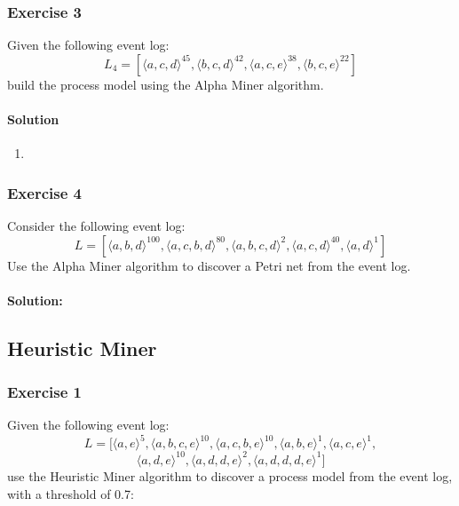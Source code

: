 \subsubsection{Exercise 3}
Given the following event log:
\[L_4 = [\langle a,c,d \rangle^{45}, \langle b,c,d \rangle^{42}, \langle a,c,e \rangle^{38}, \langle b,c,e \rangle^{22}]\]
build the process model using the Alpha Miner algorithm.
\paragraph{Solution}
\begin{enumerate}
    \item 
\end{enumerate}

\subsubsection{Exercise 4}
Consider the following event log:
\[L = [\langle a,b,d \rangle^{100}, \langle a,c,b,d \rangle^{80}, \langle a,b,c,d \rangle^{2}, \langle a,c,d \rangle^{40}, \langle a,d \rangle^{1}]\]
Use the Alpha Miner algorithm to discover a Petri net from the event log.
\paragraph{Solution:}

\subsection{Heuristic Miner}
\subsubsection{Exercise 1}
Given the following event log:
\[L = [\langle a,e \rangle^5, \langle a,b,c,e \rangle^{10}, \langle a,c,b,e \rangle^{10}, \langle a,b,e \rangle^{1}, \langle a,c,e \rangle^{1},\]
\[
\langle a,d,e \rangle^{10}, \langle a,d,d,e \rangle^{2}, \langle a,d,d,d,e \rangle^{1}]
\]
use the Heuristic Miner algorithm to discover a process model from the event log, with a threshold of 0.7:
